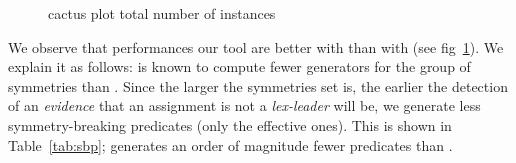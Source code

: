 \begin{figure}[!htbp]
 \centering
 \qquad
 \caption{cactus plot  total number of instances}%
 \label{fig:cactus}%
\end{figure}

We observe that performances our tool are better with \bliss{} than with
\saucy{} (see fig~\ref{fig:cactus}). We explain it as follows: \saucy{} is
known to compute fewer generators for the group of symmetries than \bliss{}.
Since the larger the symmetries set is, the earlier the detection of an
\emph{evidence} that an assignment is not a \textit{lex-leader} will be, we
generate less symmetry-breaking predicates (only the effective ones). This is
shown in Table~\ref{tab:sbp}; \cdclsym{} generates an order of magnitude fewer
predicates than \breakid{}.

